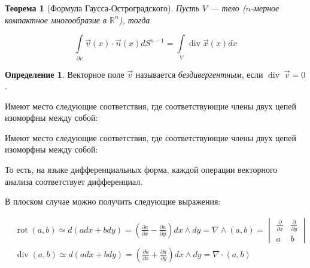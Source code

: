 \documentclass[a5paper]{article}
\newcounter{through}
\theoremstyle{plain}
\newtheorem{theorem}[through]{Теорема}
\theoremstyle{definition}
\newtheorem{definition}[through]{Определение}
\numberwithin{through}{section}
\numberwithin{equation}{section}
\DeclareMathOperator{\rot}{rot}
\DeclareMathOperator{\grad}{grad}
\DeclareMathOperator{\diver}{div}
\begin{document}
\begin{theorem}[Формула Гаусса-Остроградского]
	Пусть $V$ --- тело ($n$-мерное компактное многообразие в $\mathbb{R}^n$), тогда 
	
	\begin{equation*}
		\int\limits_{\partial v} \vec{v}(x) \cdot \vec{n}(x) d S^{n-1} = \int\limits_{V} \diver \vec{x}(x) dx 
	\end{equation*}
\end{theorem}

\begin{definition}
	Векторное поле $\vec{v}$ называется \textit{бездивергентным}, если $\diver \; \vec{v} = 0$.
\end{definition}


Имеют место следующие соответствия, где соответствующие члены двух цепей изоморфны между собой:
\begin{center}
\end{center}


Имеют место следующие соответствия, где соответствующие члены двух цепей изоморфны между собой:


То есть, на языке дифференциальных форма, каждой операции векторного анализа соответствует дифференциал. 

В плоском случае можно получить следующие выражения:

\begin{align*}
	& \rot (a, b) \simeq d (adx + bdy) = \left(\frac{\partial a}{\partial x} - \frac{\partial a}{\partial y}\right)  dx \wedge dy = \nabla \wedge (a, b) =
	\begin{vmatrix}
		\frac{\partial}{\partial x} & \frac{\partial}{\partial y} \\
		a & b
	\end{vmatrix} \\
	&\diver (a, b) \simeq d(adx + bdy) = \left(\frac{\partial a}{\partial x} + \frac{\partial a}{\partial y}\right)  dx \wedge dy = \nabla \cdot (a, b)
\end{align*}
\end{document}
